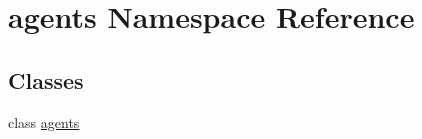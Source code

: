 \hypertarget{namespaceagents}{\section{agents Namespace Reference}
\label{namespaceagents}
}
\subsection*{Classes}
\begin{DoxyCompactItemize}
\item 
class \hyperlink{classagents_1_1agents}{agents}
\end{DoxyCompactItemize}
